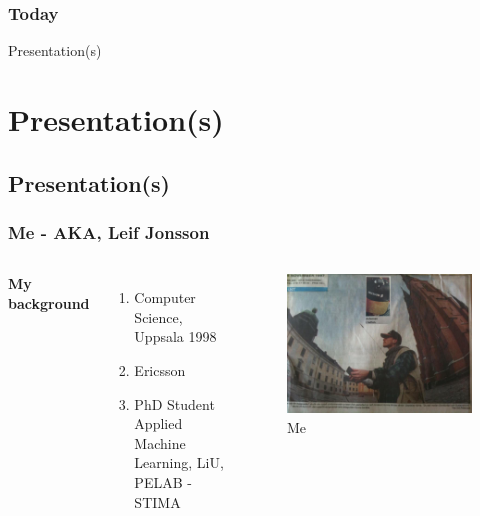 \documentclass{beamer}
\begin{document}
\begin{frame}
	\frametitle{Today} 
	\Huge{\centerline{Presentation(s)}}
\end{frame}

\section{Presentation(s)}

\subsection{Presentation(s)} %

\begin{frame}
\frametitle{Me - AKA, Leif Jonsson}
\begin{columns}[c] %

\textbf{My background}
\begin{enumerate}
\item Computer Science, Uppsala 1998
\item Ericsson
\item PhD Student Applied Machine Learning, LiU, PELAB - STIMA
\end{enumerate}

\begin{figure}[!ht]
	\includegraphics[scale=0.20]{figures/Leif}
	\caption{Me}
	\label{fig:leif}
\end{figure}

\end{columns}
\end{frame}
\end{document}
